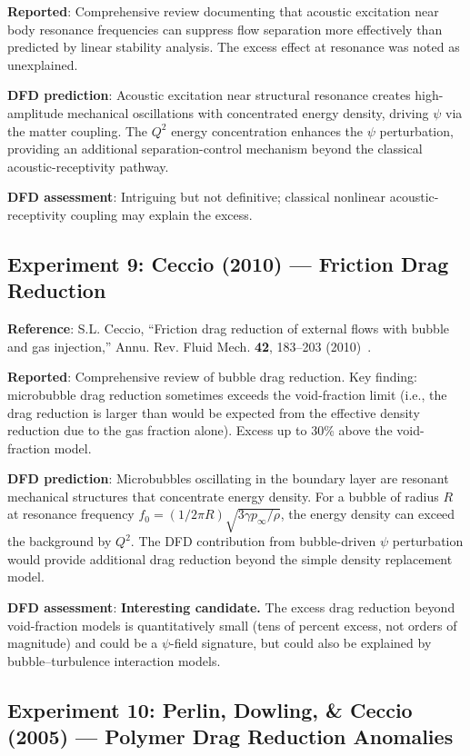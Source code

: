 \documentclass[12pt,twocolumn]{article}
\begin{document}
\textbf{Reported}: Comprehensive review documenting that acoustic excitation
near body resonance frequencies can suppress flow separation more
effectively than predicted by linear stability analysis. The excess
effect at resonance was noted as unexplained.

\textbf{DFD prediction}: Acoustic excitation near structural resonance
creates high-amplitude mechanical oscillations with concentrated energy
density, driving $\psi$ via the matter coupling. The $Q^2$ energy
concentration enhances the $\psi$ perturbation, providing an additional
separation-control mechanism beyond the classical acoustic-receptivity
pathway.

\textbf{DFD assessment}: Intriguing but not definitive; classical
nonlinear acoustic-receptivity coupling may explain the excess.

\subsection{Experiment 9: Ceccio (2010) --- Friction Drag Reduction}

\textbf{Reference}: S.L. Ceccio, ``Friction drag reduction of external
flows with bubble and gas injection,'' Annu. Rev. Fluid Mech. \textbf{42},
183--203 (2010)~\cite{ceccio2010}.

\textbf{Reported}: Comprehensive review of bubble drag reduction. Key
finding: microbubble drag reduction sometimes exceeds the void-fraction
limit (i.e., the drag reduction is larger than would be expected from
the effective density reduction due to the gas fraction alone). Excess
up to 30\% above the void-fraction model.

\textbf{DFD prediction}: Microbubbles oscillating in the boundary layer
are resonant mechanical structures that concentrate energy density. For
a bubble of radius $R$ at resonance frequency $f_0 = (1/2\pi R)
\sqrt{3\gamma p_\infty/\rho}$, the energy density can exceed the
background by $Q^2$. The DFD contribution from bubble-driven $\psi$
perturbation would provide additional drag reduction beyond the simple
density replacement model.

\textbf{DFD assessment}: \textbf{Interesting candidate.} The excess
drag reduction beyond void-fraction models is quantitatively small
(tens of percent excess, not orders of magnitude) and could be a
$\psi$-field signature, but could also be explained by bubble--turbulence
interaction models.

\subsection{Experiment 10: Perlin, Dowling, \& Ceccio (2005) ---
Polymer Drag Reduction Anomalies}
\end{document}
